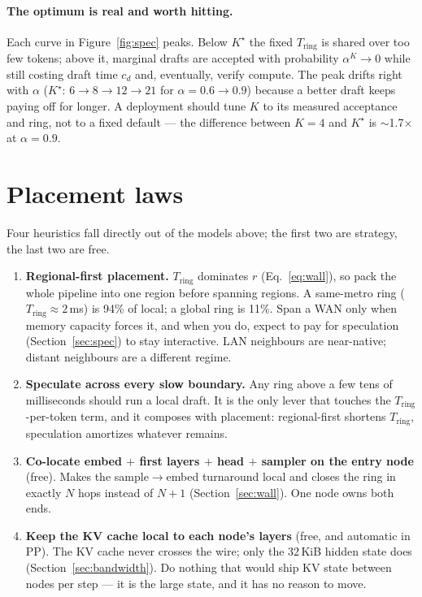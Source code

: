 \documentclass[11pt]{article}
\newcommand{\Tring}{\ensuremath{T_{\mathrm{ring}}}}
\begin{document}
\paragraph{The optimum is real and worth hitting.} Each curve in Figure~\ref{fig:spec} peaks. Below
$K^{\star}$ the fixed $\Tring$ is shared over too few tokens; above it, marginal drafts are accepted
with probability $\alpha^{K}\!\to\!0$ while still costing draft time $c_d$ and, eventually, verify
compute. The peak drifts right with $\alpha$ ($K^{\star}\!:\,6\to8\to12\to21$ for
$\alpha=0.6\to0.9$) because a better draft keeps paying off for longer. A deployment should tune $K$
to its measured acceptance and ring, not to a fixed default --- the difference between $K{=}4$ and
$K^{\star}$ is $\sim$1.7$\times$ at $\alpha=0.9$.

\section{Placement laws}
\label{sec:placement}

Four heuristics fall directly out of the models above; the first two are strategy, the last two are
free.

\begin{enumerate}[leftmargin=1.5em,itemsep=3pt]
\item \textbf{Regional-first placement.} $\Tring$ dominates $r$ (Eq.~\ref{eq:wall}), so pack the
whole pipeline into one region before spanning regions. A same-metro ring ($\Tring\!\approx\!2$\,ms)
is 94\% of local; a global ring is 11\%. Span a WAN only when memory capacity forces it, and when you
do, expect to pay for speculation (Section~\ref{sec:spec}) to stay interactive. LAN neighbours are
near-native; distant neighbours are a different regime.
\item \textbf{Speculate across every slow boundary.} Any ring above a few tens of milliseconds
should run a local draft. It is the only lever that touches the $\Tring$-per-token term, and it
composes with placement: regional-first shortens $\Tring$, speculation amortizes whatever remains.
\item \textbf{Co-locate embed $+$ first layers $+$ head $+$ sampler on the entry node} (free). Makes
the sample$\to$embed turnaround local and closes the ring in exactly $N$ hops instead of $N{+}1$
(Section~\ref{sec:wall}). One node owns both ends.
\item \textbf{Keep the KV cache local to each node's layers} (free, and automatic in PP). The KV
cache never crosses the wire; only the 32\,KiB hidden state does (Section~\ref{sec:bandwidth}). Do
nothing that would ship KV state between nodes per step --- it is the large state, and it has no
reason to move.
\end{enumerate}
\end{document}

